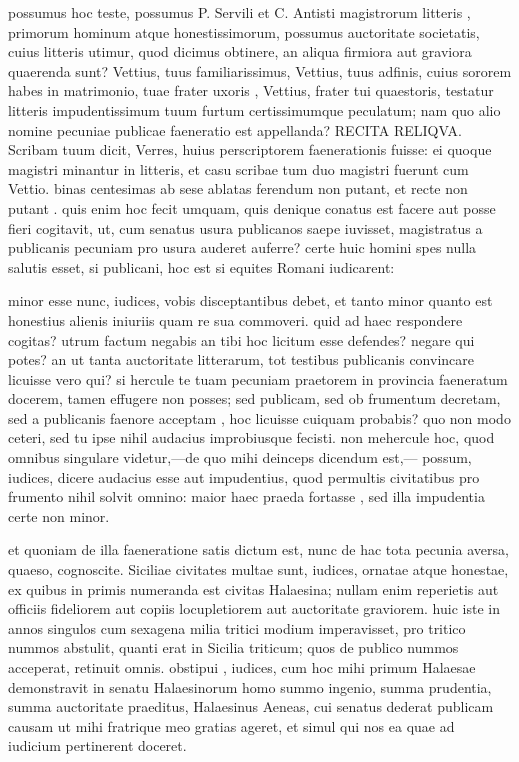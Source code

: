  possumus hoc teste, possumus P. Servili et C. Antisti magistrorum litteris , primorum hominum atque honestissimorum, possumus auctoritate societatis, cuius litteris utimur, quod dicimus obtinere, an aliqua firmiora aut graviora quaerenda sunt? Vettius, tuus familiarissimus, Vettius, tuus adfinis, cuius sororem habes in matrimonio, tuae frater uxoris , Vettius, frater tui quaestoris, testatur litteris impudentissimum tuum furtum certissimumque peculatum; nam quo alio nomine pecuniae publicae faeneratio est appellanda? RECITA RELIQVA. Scribam tuum dicit, Verres, huius perscriptorem faenerationis fuisse: ei quoque magistri minantur in litteris, et casu scribae tum duo magistri fuerunt cum Vettio. binas centesimas ab sese ablatas ferendum non putant, et recte non putant . quis enim hoc fecit umquam, quis denique conatus est facere aut posse fieri cogitavit, ut, cum senatus usura publicanos saepe iuvisset, magistratus a publicanis pecuniam pro usura auderet auferre? certe huic homini spes nulla salutis esset, si publicani, hoc est si equites Romani iudicarent:

 minor esse nunc, iudices, vobis disceptantibus debet, et tanto minor quanto est honestius alienis iniuriis quam re sua commoveri. quid ad haec respondere cogitas? utrum factum negabis an tibi hoc licitum esse defendes? negare qui potes? an ut tanta auctoritate litterarum, tot testibus publicanis convincare licuisse vero qui? si hercule te tuam pecuniam praetorem in provincia faeneratum docerem, tamen effugere non posses; sed publicam, sed ob frumentum decretam, sed a publicanis faenore acceptam , hoc licuisse cuiquam probabis? quo non modo ceteri, sed tu ipse nihil audacius improbiusque fecisti. non mehercule hoc, quod omnibus singulare videtur,—de quo mihi deinceps dicendum est,— possum, iudices, dicere audacius esse aut impudentius, quod permultis civitatibus pro frumento nihil solvit omnino: maior haec praeda fortasse , sed illa impudentia certe non minor.

 et quoniam de illa faeneratione satis dictum est, nunc de hac tota pecunia aversa, quaeso, cognoscite. Siciliae civitates multae sunt, iudices, ornatae atque honestae, ex quibus in primis numeranda est civitas Halaesina; nullam enim reperietis aut officiis fideliorem aut copiis locupletiorem aut auctoritate graviorem. huic iste in annos singulos cum sexagena milia tritici modium imperavisset, pro tritico nummos abstulit, quanti erat in Sicilia triticum; quos de publico nummos acceperat, retinuit omnis. obstipui , iudices, cum hoc mihi primum Halaesae demonstravit in senatu Halaesinorum homo summo ingenio, summa prudentia, summa auctoritate praeditus, Halaesinus Aeneas, cui senatus dederat publicam causam ut mihi fratrique meo gratias ageret, et simul qui nos ea quae ad iudicium pertinerent doceret.

